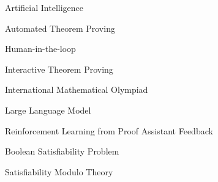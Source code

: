 \begin{siglas}
  \item[AI] Artificial Intelligence
  \item[ATP] Automated Theorem Proving
  \item[HITL] Human-in-the-loop
  \item[ITP] Interactive Theorem Proving
  \item[IMO] International Mathematical Olympiad
  \item[LLM] Large Language Model
  \item[RLPAF] Reinforcement Learning from Proof Assistant Feedback
  \item[SAT] Boolean Satisfiability Problem
  \item[SMT] Satisfiability Modulo Theory
\end{siglas}
